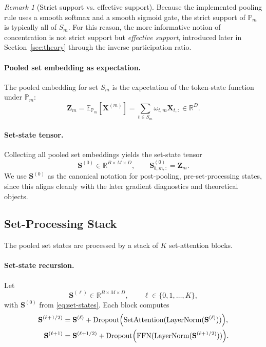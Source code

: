 \documentclass{article}
\theoremstyle{plain}
\theoremstyle{definition}
\theoremstyle{remark}
\newtheorem{remark}[theorem]{Remark}
\begin{document}
\begin{remark}[Strict support vs. effective support]
\label{rem:support-vs-effective-support}
Because the implemented pooling rule uses a smooth softmax and a smooth sigmoid gate, the strict support of $\mathbb P_m$ is typically all of $S_m$. For this reason, the more informative notion of concentration is not strict support but \emph{effective support}, introduced later in Section~\ref{sec:theory} through the inverse participation ratio.
\end{remark}

\paragraph{Pooled set embedding as expectation.}
The pooled embedding for set $S_m$ is the expectation of the token-state function under $\mathbb P_m$:
\begin{equation}
\label{eq:pooled-embedding}
\mathbf Z_m
=
\mathbb E_{\mathbb P_m}[\mathbf X^{(m)}]
=
\sum_{t\in S_m}\omega_{t,m}\mathbf X_{t,:}
\in\mathbb R^D.
\end{equation}

\paragraph{Set-state tensor.}
Collecting all pooled set embeddings yields the set-state tensor
\begin{equation}
\label{eq:set-states}
\mathbf S^{(0)}\in\mathbb R^{B\times M\times D},
\qquad
\mathbf S^{(0)}_{b,m,:}=\mathbf Z_m.
\end{equation}
We use $\mathbf S^{(0)}$ as the canonical notation for post-pooling, pre-set-processing states, since this aligns cleanly with the later gradient diagnostics and theoretical objects.

\subsection{Set-Processing Stack}
\label{sec:set-processing}

The pooled set states are processed by a stack of $K$ set-attention blocks.

\paragraph{Set-state recursion.}
Let
\begin{equation}
\label{eq:set-state-levels}
\mathbf S^{(\ell)}\in\mathbb R^{B\times M\times D},
\qquad
\ell\in\{0,1,\dots,K\},
\end{equation}
with $\mathbf S^{(0)}$ from \eqref{eq:set-states}. Each block computes
\begin{align}
\label{eq:block-attention}
\mathbf S^{(\ell+1/2)} &= \mathbf S^{(\ell)} + \operatorname{Dropout}\Bigl(\operatorname{SetAttention}(\operatorname{LayerNorm}(\mathbf S^{(\ell)}))\Bigr),\\
\label{eq:block-ffn}
\mathbf S^{(\ell+1)} &= \mathbf S^{(\ell+1/2)} + \operatorname{Dropout}\Bigl(\operatorname{FFN}(\operatorname{LayerNorm}(\mathbf S^{(\ell+1/2)}))\Bigr).
\end{align}
\end{document}
